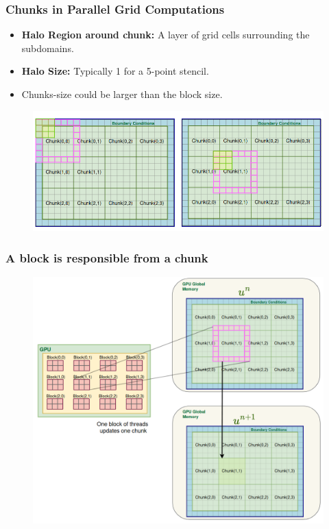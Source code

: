\documentclass[9pt]{beamer}
\begin{document}
\begin{frame}
\frametitle{Chunks in Parallel Grid Computations}
\begin{itemize}
    \item \textbf{Halo Region around chunk:} A layer of grid cells surrounding the subdomains.
    \item \textbf{Halo Size:} Typically 1 for a 5-point stencil.
    \item Chunks-size could be larger than the block size.
\end{itemize}

\begin{figure}
    \centering
    \includegraphics[width=0.8\linewidth]{Screenshot from 2024-08-30 19-03-50.png}
    \label{fig:enter-label}
\end{figure}
\end{frame}




\begin{frame}
\frametitle{A block is responsible from a chunk}
\begin{figure}
    \centering
    \includegraphics[height=0.9\textheight]{Screenshot from 2024-10-01 12-51-51.png}
    \label{fig:enter-label}
\end{figure}
\end{frame}
\end{document}
